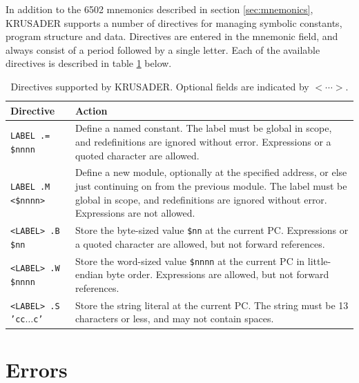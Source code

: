 \documentclass[12pt]{article}
\newcommand{\krusader}{\textsf{KRUSADER}\xspace}
\begin{document}
In addition to the 6502 mnemonics described in section \ref{sec:mnemonics}, \krusader supports
a number of directives for managing symbolic constants, program structure and data.  
Directives are entered in the mnemonic field, and always consist of a period followed by a single letter.
Each of the available directives is described in table \ref{tab:directives} below.

\begin{table}[htb]
	\centering
	\begin{tabular}{|l|p{10cm}|} \hline
	\textbf{Directive} & \textbf{Action} \tabularnewline
	\hline
	\texttt{LABEL  .=  \$nnnn} & Define a named constant.  The label must be global in scope, 
															and redefinitions are ignored without error.  Expressions or
															a quoted character are allowed.
															\tabularnewline
	\texttt{LABEL  .M  <\$nnnn>} & Define a new module, optionally at the specified address, or else
															just continuing on from the previous module.  The label must be global in scope, 
															and redefinitions are ignored without error.  Expressions are not
															allowed.\tabularnewline
	\texttt{<LABEL> .B  \$nn} & Store the byte-sized value \texttt{\$nn} at the current PC. Expressions or a quoted character are 
															allowed, but not forward references.\tabularnewline
	\texttt{<LABEL> .W  \$nnnn} & Store the word-sized value \texttt{\$nnnn} at the current PC in 
															little-endian byte order. Expressions are 
															allowed, but not forward references.\tabularnewline
	\texttt{<LABEL> .S  'cc$\ldots$c'} & Store the string literal at the current PC.  The string must
															be 13 characters or less, and may not contain spaces.\tabularnewline
	\hline
	\end{tabular}
	\caption{Directives supported by \krusader.  Optional fields are indicated by $<\cdots>$.}
	\label{tab:directives}
\end{table}

\section{Errors}
\end{document}
